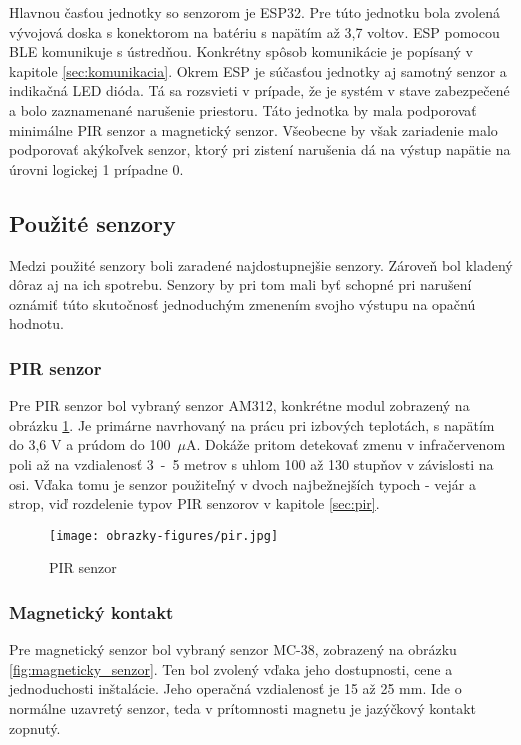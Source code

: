 Hlavnou časťou jednotky so senzorom je ESP32. Pre túto jednotku bola zvolená vývojová doska s konektorom na batériu s napätím až 3,7 voltov. ESP pomocou BLE komunikuje s ústredňou. Konkrétny spôsob komunikácie je popísaný v kapitole \ref{sec:komunikacia}. Okrem ESP je súčasťou jednotky aj samotný senzor a indikačná LED dióda. Tá sa rozsvieti v prípade, že je systém v stave zabezpečené a bolo zaznamenané narušenie priestoru. Táto jednotka by mala podporovať minimálne PIR senzor a magnetický senzor. Všeobecne by však zariadenie malo podporovať akýkoľvek senzor, ktorý pri zistení narušenia dá na výstup napätie na úrovni logickej 1 prípadne 0.

\subsection{Použité senzory}

Medzi použité senzory boli zaradené najdostupnejšie senzory. Zároveň bol kladený dôraz aj na ich spotrebu. Senzory by pri tom mali byť schopné pri narušení oznámiť túto skutočnosť jednoduchým zmenením svojho výstupu na opačnú hodnotu.

\subsubsection{PIR senzor}

Pre PIR senzor bol vybraný senzor AM312, konkrétne modul zobrazený na obrázku \ref{fig:pir}. Je primárne navrhovaný na prácu pri izbových teplotách, s napätím do 3,6 V a prúdom do 100~$\mu$A. Dokáže pritom detekovať zmenu v infračervenom poli až na vzdialenosť 3~-~5 metrov s uhlom 100 až 130 stupňov v závislosti na osi. Vďaka tomu je senzor použiteľný v dvoch najbežnejších typoch - vejár a strop, viď rozdelenie typov PIR senzorov v kapitole \ref{sec:pir}.\cite{pir-datasheet}

\begin{figure}[ht]
    \centering
    \texttt{[image: obrazky-figures/pir.jpg]}
    \caption[PIR senzor]{PIR senzor\footnotemark}
    \label{fig:pir}
\end{figure}

\subsubsection{Magnetický kontakt}

Pre magnetický senzor bol vybraný senzor MC-38, zobrazený na obrázku \ref{fig:magneticky_senzor}. Ten bol zvolený vďaka jeho dostupnosti, cene a jednoduchosti inštalácie. Jeho operačná vzdialenosť je 15 až 25 mm. Ide o normálne uzavretý senzor, teda v prítomnosti magnetu je jazýčkový kontakt zopnutý.

